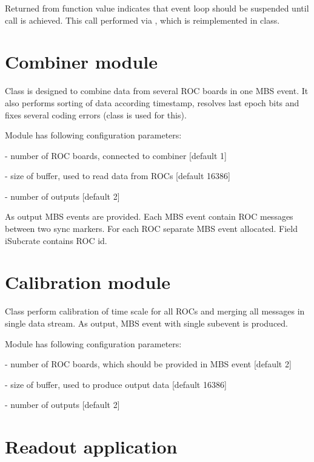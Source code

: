 Returned from function  value  indicates 
that event loop should be suspended until call  is achieved.
This call performed via , which is reimplemented in  class. 


\section{Combiner module}

Class  is designed to combine data from several ROC boards in one MBS event. It also performs sorting of
data according timestamp, resolves last epoch bits and fixes several coding errors (class  is
used for this).

Module has following configuration parameters:
\bbul
\item {}     - number of ROC boards, connected to combiner [default 1]  
\item {}  - size of buffer, used to read data from ROCs [default 16386]
\item {}  - number of outputs [default 2]
\ebul

As output MBS events are provided. Each MBS event contain ROC messages between two sync markers.
For each ROC separate MBS event allocated. Field iSubcrate contains ROC id.


\section{Calibration module}

Class  perform calibration of time scale for all
ROCs and merging all messages in single data stream. As output, MBS event with single
subevent is produced. 

Module has following configuration parameters:
\bbul
\item {}     - number of ROC boards, which should be provided in MBS event [default 2]  
\item {}  - size of buffer, used to produce output data [default 16386]
\item {}  - number of outputs [default 2]
\ebul
 

\section{Readout application}

